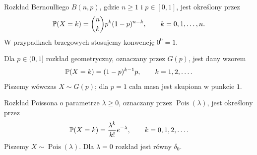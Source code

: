 \begin{przyklad}
\label{przykl:rozklad-bernoulliego}
Rozkład Bernoulliego $B(n,p)$, gdzie $n\geq1$ i $p\in[0,1]$,
jest określony przez
\[
  \mathbb{P}(X=k)=\binom nk p^k(1-p)^{n-k},
  \qquad k=0,1,\ldots,n.
\]
W przypadkach brzegowych stosujemy konwencję $0^0=1$.
\end{przyklad}

\begin{przyklad}
\label{przykl:rozklad-geometryczny}
Dla $p\in(0,1]$ rozkład geometryczny, oznaczany przez $G(p)$,
jest dany wzorem
\[
  \mathbb{P}(X=k)=(1-p)^{k-1}p,\qquad k=1,2,\ldots.
\]
Piszemy wówczas $X\sim G(p)$; dla $p=1$ cała masa jest skupiona w punkcie $1$.
\end{przyklad}

\begin{przyklad}
\label{przykl:rozklad-poissona}
Rozkład Poissona o parametrze $\lambda\geq0$, oznaczany przez
$\operatorname{Pois}(\lambda)$, jest określony przez
\[
  \mathbb{P}(X=k)=\frac{\lambda^k}{k!}e^{-\lambda},
  \qquad k=0,1,2,\ldots.
\]
Piszemy $X\sim\operatorname{Pois}(\lambda)$.
Dla $\lambda=0$ rozkład jest równy $\delta_0$.
\end{przyklad}
